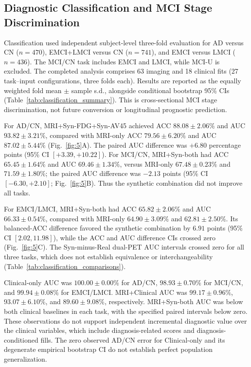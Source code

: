 \subsection{Diagnostic Classification and MCI Stage Discrimination}
Classification used independent subject-level three-fold evaluation for AD versus CN ($n=470$), EMCI+LMCI versus CN ($n=741$), and EMCI versus LMCI ($n=436$). The MCI/CN task includes EMCI and LMCI, while MCI-U is excluded. The completed analysis comprises 63 imaging and 18 clinical fits (27 task--input configurations, three folds each). Results are reported as the equally weighted fold mean $\pm$ sample s.d., alongside conditional bootstrap 95\% CIs (Table~\ref{tab:classification_summary}). This is cross-sectional MCI stage discrimination, not future conversion or longitudinal prognostic prediction.

For AD/CN, MRI+Syn-FDG+Syn-AV45 achieved ACC $88.08\pm2.06\%$ and AUC $93.82\pm3.21\%$, compared with MRI-only ACC $79.56\pm6.20\%$ and AUC $87.02\pm5.44\%$ (Fig.~\ref{fig:5}A). The paired AUC difference was $+6.80$ percentage points (95\% CI $[+3.39,+10.22]$). For MCI/CN, MRI+Syn-both had ACC $65.45\pm1.64\%$ and AUC $69.46\pm1.34\%$, versus MRI-only $67.48\pm0.23\%$ and $71.59\pm1.80\%$; the paired AUC difference was $-2.13$ points (95\% CI $[-6.30,+2.10]$; Fig.~\ref{fig:5}B). Thus the synthetic combination did not improve all tasks.

For EMCI/LMCI, MRI+Syn-both had ACC $65.82\pm2.06\%$ and AUC $66.33\pm0.54\%$, compared with MRI-only $64.90\pm3.09\%$ and $62.81\pm2.50\%$. Its balanced-ACC difference favored the synthetic combination by $6.91$ points (95\% CI $[2.02,11.98]$), while the ACC and AUC difference CIs crossed zero (Fig.~\ref{fig:5}C). The Syn-minus-Real dual-PET AUC intervals crossed zero for all three tasks, which does not establish equivalence or interchangeability (Table~\ref{tab:classification_comparisons}).

Clinical-only AUC was $100.00\pm0.00\%$ for AD/CN, $98.93\pm0.70\%$ for MCI/CN, and $99.94\pm0.08\%$ for EMCI/LMCI. MRI+Clinical AUC was $99.17\pm0.96\%$, $93.07\pm6.10\%$, and $89.60\pm9.08\%$, respectively. MRI+Syn-both AUC was below both clinical baselines in each task, with the specified paired intervals below zero. These observations do not support independent incremental diagnostic value over the clinical variables, which include diagnosis-related scores and diagnosis-conditioned fills. The zero observed AD/CN error for Clinical-only and its degenerate empirical bootstrap CI do not establish perfect population generalization.

